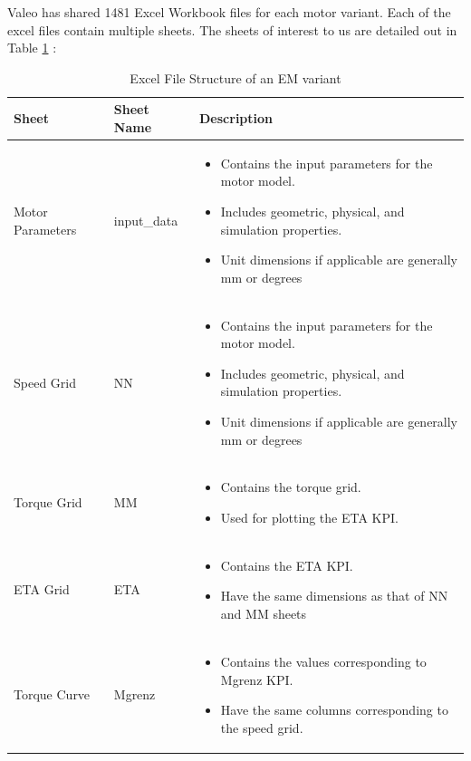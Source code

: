 \documentclass{report} %
\begin{document}
Valeo has shared 1481 Excel Workbook files for each motor variant. Each of the excel files contain multiple sheets.
The sheets of interest to us are detailed out in Table \ref{tab:Excel File Structure} :
\begin{table}[H]
    \centering
    \begin{tabular}{|p{2cm}|p{2cm}|p{11cm}|}
    \hline {\bf Sheet} & {\bf Sheet Name} & {\bf Description}\\
    \hline Motor Parameters & input\_data & 
    \begin{itemize}
        \item Contains the input parameters for the motor model.
        \item Includes geometric, physical, and simulation properties.
        \item Unit dimensions if applicable are generally mm or degrees 
    \end{itemize}\\
    Speed Grid & NN & 
    \begin{itemize}
        \item Contains the input parameters for the motor model.
        \item Includes geometric, physical, and simulation properties.
        \item Unit dimensions if applicable are generally mm or degrees 
    \end{itemize}\\
    Torque Grid & MM & 
    \begin{itemize}
        \item Contains the torque grid.
        \item Used for plotting the ETA \ac{KPI}.
    \end{itemize}\\
    ETA Grid & ETA & 
    \begin{itemize}
        \item Contains the ETA \ac{KPI}.
        \item Have the same dimensions as that of NN and MM sheets
    \end{itemize}\\
    Torque Curve & Mgrenz & 
    \begin{itemize}
        \item Contains the values corresponding to Mgrenz \ac{KPI}.
        \item Have the same columns corresponding to the speed grid.
    \end{itemize}\\
    \hline
    \end{tabular}
    \caption{Excel File Structure of an \ac{EM} variant}
    \label{tab:Excel File Structure}
\end{table}
\end{document}
